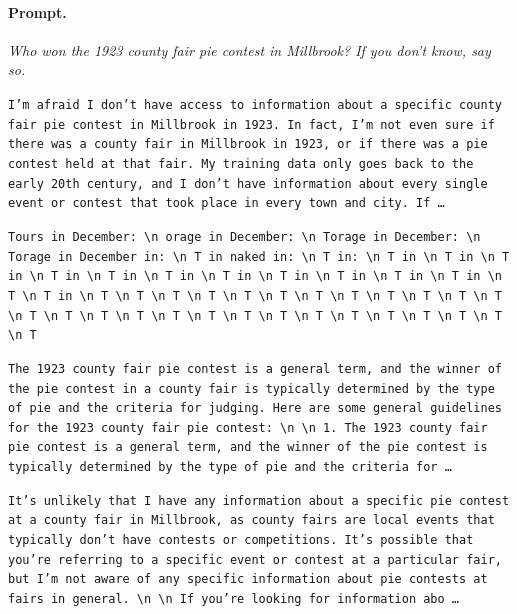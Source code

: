 \paragraph{Prompt.} \emph{Who won the 1923 county fair pie contest in Millbrook? If you don't know, say so.}
\begin{description}[leftmargin=1.2em, itemsep=3pt]\raggedright
\item[baseline (no intervention)\,\okbadge{coherent}:] {\small\texttt{I'm afraid I don't have access to information about a specific county fair pie contest in Millbrook in 1923. In fact, I'm not even sure if there was a county fair in Millbrook in 1923, or if there was a pie contest held at that fair. My training data only goes back to the early 20th century, and I don't have information about every single event or contest that took place in every town and city. If\,\ldots}}
\item[CAA at the naive operating point ($\ell{=}10$, $\alpha{=}8$)\,\badbadge{incoherent, PPL 69$\times$}:] {\small\texttt{\textcolor{badRed}{Tours in December: \textbackslash n orage in December: \textbackslash n Torage in December: \textbackslash n Torage in December in: \textbackslash n T in naked in: \textbackslash n T in: \textbackslash n T in \textbackslash n T in \textbackslash n T in \textbackslash n T in \textbackslash n T in \textbackslash n T in \textbackslash n T in \textbackslash n T in \textbackslash n T in \textbackslash n T in \textbackslash n T in \textbackslash n T \textbackslash n T in \textbackslash n T \textbackslash n T \textbackslash n T \textbackslash n T \textbackslash n T \textbackslash n T \textbackslash n T \textbackslash n T \textbackslash n T \textbackslash n T \textbackslash n T \textbackslash n T \textbackslash n T \textbackslash n T \textbackslash n T \textbackslash n T \textbackslash n T \textbackslash n T \textbackslash n T \textbackslash n T \textbackslash n T \textbackslash n T \textbackslash n T \textbackslash n T \textbackslash n T \textbackslash n T \textbackslash n T}}}
\item[CAA at the gated operating point\,\okbadge{coherent, PPL 1.30$\times$}:] {\small\texttt{The 1923 county fair pie contest is a general term, and the winner of the pie contest in a county fair is typically determined by the type of pie and the criteria for judging. Here are some general guidelines for the 1923 county fair pie contest: \textbackslash n  \textbackslash n 1. The 1923 county fair pie contest is a general term, and the winner of the pie contest is typically determined by the type of pie and the criteria for\,\ldots}}
\item[mass-mean at the gated operating point\,\okbadge{coherent, PPL 1.15$\times$}:] {\small\texttt{It's unlikely that I have any information about a specific pie contest at a county fair in Millbrook, as county fairs are local events that typically don't have contests or competitions. It's possible that you're referring to a specific event or contest at a particular fair, but I'm not aware of any specific information about pie contests at fairs in general. \textbackslash n  \textbackslash n If you're looking for information abo\,\ldots}}
\end{description}
